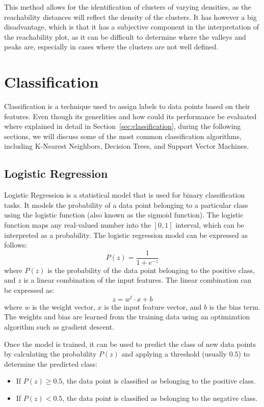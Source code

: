 This method allows for the identification of clusters of varying densities, as the reachability distances will reflect the density of the clusters. It has however a big disadvantage, which is that it has a subjective component in the interpretation of the reachability plot, as it can be difficult to determine where the valleys and peaks are, especially in cases where the clusters are not well defined.

\section{Classification}

Classification is a technique used to assign labels to data points based on their features. Even though its generlities and how could its performance be evaluated where explained in detail in Section~\ref{sec:classification}, during the following sections, we will discuss some of the most common classification algorithms, including K-Nearest Neighbors, Decision Trees, and Support Vector Machines.

\subsection{Logistic Regression}

Logistic Regression is a statistical model that is used for binary classification tasks. It models the probability of a data point belonging to a particular class using the logistic function (also known as the sigmoid function). The logistic function maps any real-valued number into the $[0, 1]$ interval, which can be interpreted as a probability. The logistic regression model can be expressed as follows:
\begin{equation*}
    P(z) = \frac{1}{1 + e^{-z}}
\end{equation*}
where $P(z)$ is the probability of the data point belonging to the positive class, and $z$ is a linear combination of the input features. The linear combination can be expressed as:
\begin{equation*}
    z = w^t \cdot x + b
\end{equation*}
where $w$ is the weight vector, $x$ is the input feature vector, and $b$ is the bias term. The weights and bias are learned from the training data using an optimization algorithm such as gradient descent.

Once the model is trained, it can be used to predict the class of new data points by calculating the probability $P(z)$ and applying a threshold (usually $0.5$) to determine the predicted class:
\begin{itemize}
    \item If $P(z) \geq 0.5$, the data point is classified as belonging to the positive class.
    \item If $P(z) < 0.5$, the data point is classified as belonging to the negative class.
\end{itemize}

